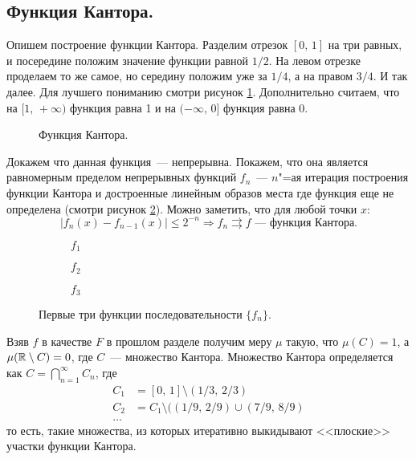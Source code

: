 \subsection{Функция Кантора.}

Опишем построение функции Кантора. Разделим отрезок $[0,\, 1]$ на три равных, и посередине положим значение функции равной $1/2$.
На левом отрезке проделаем то же самое, но середину положим уже за $1/4$, а на правом $3/4$. И так далее. Для лучшего пониманию смотри рисунок \ref{fig:kantor}.
Дополнительно считаем, что на $[1,\,+\infty)$ функция равна 1 и на $(-\infty,\, 0]$ функция равна 0.

\begin{figure}[!ht]
    \centering
    
    \caption{Функция Кантора.}
    \label{fig:kantor}
\end{figure}

Докажем что данная функция~--- непрерывна. Покажем, что она является равномерным пределом непрерывных функций $f_n$~--- $n$"=ая итерация построения функции Кантора и 
достроенные линейным образов места где функция еще не определена (смотри рисунок \ref{fig:k123}). Можно заметить, что для любой точки $x$:
\[
    |f_n(x)-f_{n-1}(x)|\leqslant 2^{-n}\Rightarrow f_n\rightrightarrows f\text{~--- функция Кантора.}    
\]

\begin{figure}
    \centering
    \begin{subfigure}{.5\textwidth}
        \centering
        
        \caption{$f_1$}
    \end{subfigure}%
    \begin{subfigure}{.5\textwidth}
        \centering
        
        \caption{$f_2$}
    \end{subfigure}
    \begin{subfigure}{.5\textwidth}
        \centering
        
        \caption{$f_3$}
    \end{subfigure}
    \caption{Первые три функции последовательности $\{f_n\}$.}
    \label{fig:k123}
\end{figure}

Взяв $f$ в качестве $F$ в прошлом разделе получим меру $\mu$ такую, что $\mu(C)=1$, а $\mu(\mathbb{R}\setminus C)=0$, где $C$~--- множество Кантора. 
Множество Кантора определяется как $C=\bigcap\limits_{n=1}^{\infty}C_n$, где 
\begin{align*}
    C_1 &= [0,\, 1]\setminus (1/3,\, 2/3)\\
    C_2 &= C_1\setminus ((1/9,\, 2/9)\cup (7/9,\, 8/9)\\
    \ldots
\end{align*}
то есть, такие множества, из которых итеративно выкидывают <<плоские>> участки функции Кантора.

